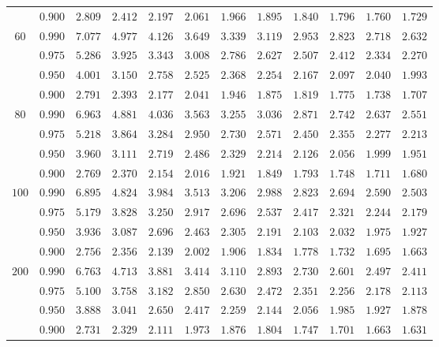 \documentclass[11pt]{article}
\theoremstyle{definition}
\begin{document}
\begin{table}[H]
\begin{tabularx}{\linewidth}{c | c | c c c c c c c c c c}
		& $0.900$ & $2.809$ & $2.412$ & $2.197$ & $2.061$ & $1.966$ & $1.895$ & $1.840$ & $1.796$ & $1.760$ & $1.729$ \\
		$60$ & $0.990$ & $7.077$ & $4.977$ & $4.126$ & $3.649$ & $3.339$ & $3.119$ & $2.953$ & $2.823$ & $2.718$ & $2.632$ \\
		& $0.975$ & $5.286$ & $3.925$ & $3.343$ & $3.008$ & $2.786$ & $2.627$ & $2.507$ & $2.412$ & $2.334$ & $2.270$ \\
		& $0.950$ & $4.001$ & $3.150$ & $2.758$ & $2.525$ & $2.368$ & $2.254$ & $2.167$ & $2.097$ & $2.040$ & $1.993$ \\
		& $0.900$ & $2.791$ & $2.393$ & $2.177$ & $2.041$ & $1.946$ & $1.875$ & $1.819$ & $1.775$ & $1.738$ & $1.707$ \\
		$80$ & $0.990$ & $6.963$ & $4.881$ & $4.036$ & $3.563$ & $3.255$ & $3.036$ & $2.871$ & $2.742$ & $2.637$ & $2.551$ \\
		& $0.975$ & $5.218$ & $3.864$ & $3.284$ & $2.950$ & $2.730$ & $2.571$ & $2.450$ & $2.355$ & $2.277$ & $2.213$ \\
		& $0.950$ & $3.960$ & $3.111$ & $2.719$ & $2.486$ & $2.329$ & $2.214$ & $2.126$ & $2.056$ & $1.999$ & $1.951$ \\
		& $0.900$ & $2.769$ & $2.370$ & $2.154$ & $2.016$ & $1.921$ & $1.849$ & $1.793$ & $1.748$ & $1.711$ & $1.680$ \\
		$100$ & $0.990$ & $6.895$ & $4.824$ & $3.984$ & $3.513$ & $3.206$ & $2.988$ & $2.823$ & $2.694$ & $2.590$ & $2.503$ \\
		& $0.975$ & $5.179$ & $3.828$ & $3.250$ & $2.917$ & $2.696$ & $2.537$ & $2.417$ & $2.321$ & $2.244$ & $2.179$ \\
		& $0.950$ & $3.936$ & $3.087$ & $2.696$ & $2.463$ & $2.305$ & $2.191$ & $2.103$ & $2.032$ & $1.975$ & $1.927$ \\
		& $0.900$ & $2.756$ & $2.356$ & $2.139$ & $2.002$ & $1.906$ & $1.834$ & $1.778$ & $1.732$ & $1.695$ & $1.663$ \\
		$200$ & $0.990$ & $6.763$ & $4.713$ & $3.881$ & $3.414$ & $3.110$ & $2.893$ & $2.730$ & $2.601$ & $2.497$ & $2.411$ \\
		& $0.975$ & $5.100$ & $3.758$ & $3.182$ & $2.850$ & $2.630$ & $2.472$ & $2.351$ & $2.256$ & $2.178$ & $2.113$ \\
		& $0.950$ & $3.888$ & $3.041$ & $2.650$ & $2.417$ & $2.259$ & $2.144$ & $2.056$ & $1.985$ & $1.927$ & $1.878$ \\
		& $0.900$ & $2.731$ & $2.329$ & $2.111$ & $1.973$ & $1.876$ & $1.804$ & $1.747$ & $1.701$ & $1.663$ & $1.631$ \\

\end{tabularx}
\end{table}
\end{document}
